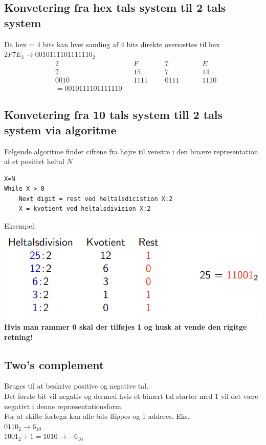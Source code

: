 \documentclass[12pt, a4paper]{article}
\begin{document}
			\subsection{Konvetering fra hex tals system til 2 tals system}
				Da hex = 4 bits kan hver samling af 4 bits direkte oversættes til hex
				$2F7E_3\rightarrow 0010111101111110_{2}$\\
				\begin{align*}
					&2&&F&&&7&&&&E\\
					&2&&15&&&7&&&&14\\
					&0010&&1111&&&0111&&&&1110\\
					&=0010111101111110
				\end{align*}
			\subsection{Konvetering fra 10 tals system till 2 tals system via algoritme}
				Følgende algoritme finder cifrene fra højre til venstre i den binære representation af et positivt heltal $N$\\
				\begin{lstlisting}
X=N
While X > 0
	Next digit = rest ved heltalsdicistion X:2
	X = kvotient ved heltalsdivision X:2
				\end{lstlisting}
				Eksempel:\\
				\includegraphics[width=\linewidth]{assets/binAlgoritme.png}
				\textbf{Hvis man rammer 0 skal der tilføjes 1 og husk at vende den rigitge retning!}
			\subsection{Two's complement}
				Bruges til at beskrive positive og negative tal.\\
				Det første bit vil negativ og dermed hvis et binært tal starter med 1 vil det være negativt i denne repræsentationsform.\\
				For at skifte fortegn kan alle bits flippes og 1 adderes. Eks. \\
				$0110_2 \rightarrow 6_{10}$\\
				$1001_2+1=1010 \rightarrow -6_{10}$
\end{document}
